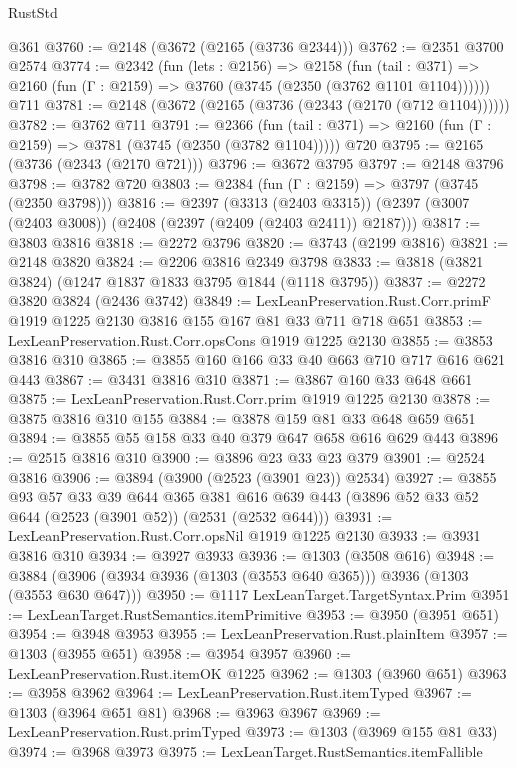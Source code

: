 \begin{lexlean}{RustStd}
\begin{coremodule}
    @361
@3760 := @2148 (@3672 (@2165 (@3736 @2344)))
@3762 := @2351 @3700 @2574
@3774 := @2342
    (fun (lets : @2156) =>
    @2158
      (fun (tail : @371) => @2160 (fun (Γ : @2159) => @3760 (@3745 (@2350 (@3762 @1101 @1104))))))
    @711
@3781 := @2148 (@3672 (@2165 (@3736 (@2343 (@2170 (@712 @1104))))))
@3782 := @3762 @711
@3791 := @2366
    (fun (tail : @371) => @2160 (fun (Γ : @2159) => @3781 (@3745 (@2350 (@3782 @1104)))))
    @720
@3795 := @2165 (@3736 (@2343 (@2170 @721)))
@3796 := @3672 @3795
@3797 := @2148 @3796
@3798 := @3782 @720
@3803 := @2384 (fun (Γ : @2159) => @3797 (@3745 (@2350 @3798)))
@3816 := @2397
    (@3313 (@2403 @3315))
    (@2397 (@3007 (@2403 @3008)) (@2408 (@2397 (@2409 (@2403 @2411)) @2187)))
@3817 := @3803 @3816
@3818 := @2272 @3796
@3820 := @3743 (@2199 @3816)
@3821 := @2148 @3820
@3824 := @2206 @3816 @2349 @3798
@3833 := @3818 (@3821 @3824) (@1247 @1837 @1833 @3795 @1844 (@1118 @3795))
@3837 := @2272 @3820 @3824 (@2436 @3742)
@3849 := LexLeanPreservation.Rust.Corr.primF
    @1919
    @1225
    @2130
    @3816
    @155
    @167
    @81
    @33
    @711
    @718
    @651
@3853 := LexLeanPreservation.Rust.Corr.opsCons @1919 @1225 @2130
@3855 := @3853 @3816 @310
@3865 := @3855 @160 @166 @33 @40 @663 @710 @717 @616 @621 @443
@3867 := @3431 @3816 @310
@3871 := @3867 @160 @33 @648 @661
@3875 := LexLeanPreservation.Rust.Corr.prim @1919 @1225 @2130
@3878 := @3875 @3816 @310 @155
@3884 := @3878 @159 @81 @33 @648 @659 @651
@3894 := @3855 @55 @158 @33 @40 @379 @647 @658 @616 @629 @443
@3896 := @2515 @3816 @310
@3900 := @3896 @23 @33 @23 @379
@3901 := @2524 @3816
@3906 := @3894 (@3900 (@2523 (@3901 @23)) @2534)
@3927 := @3855
    @93
    @57
    @33
    @39
    @644
    @365
    @381
    @616
    @639
    @443
    (@3896 @52 @33 @52 @644 (@2523 (@3901 @52)) (@2531 (@2532 @644)))
@3931 := LexLeanPreservation.Rust.Corr.opsNil @1919 @1225 @2130
@3933 := @3931 @3816 @310
@3934 := @3927 @3933
@3936 := @1303 (@3508 @616)
@3948 := @3884 (@3906 (@3934 @3936 (@1303 (@3553 @640 @365))) @3936 (@1303 (@3553 @630 @647)))
@3950 := @1117 LexLeanTarget.TargetSyntax.Prim
@3951 := LexLeanTarget.RustSemantics.itemPrimitive
@3953 := @3950 (@3951 @651)
@3954 := @3948 @3953
@3955 := LexLeanPreservation.Rust.plainItem
@3957 := @1303 (@3955 @651)
@3958 := @3954 @3957
@3960 := LexLeanPreservation.Rust.itemOK @1225
@3962 := @1303 (@3960 @651)
@3963 := @3958 @3962
@3964 := LexLeanPreservation.Rust.itemTyped
@3967 := @1303 (@3964 @651 @81)
@3968 := @3963 @3967
@3969 := LexLeanPreservation.Rust.primTyped
@3973 := @1303 (@3969 @155 @81 @33)
@3974 := @3968 @3973
@3975 := LexLeanTarget.RustSemantics.itemFallible

\end{coremodule}
\end{lexlean}
